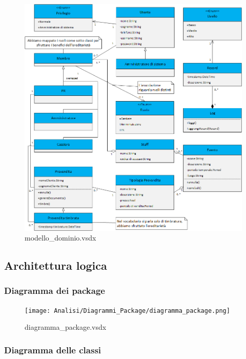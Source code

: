 \documentclass[a4paper]{article}
\begin{document}
\begin{figure}[H]
    \includegraphics[scale=0.68]{Analisi/modello_dominio.png}
    \centering
    \caption{modello\_dominio.vsdx}
\end{figure}

\newpage

\subsection{Architettura logica}

\subsubsection{Diagramma dei package}


\begin{figure}[H]
    \texttt{[image: Analisi/Diagrammi\_Package/diagramma\_package.png]}
    \centering
    \caption{diagramma\_package.vsdx}
\end{figure}

\newpage

\subsubsection{Diagramma delle classi}
\end{document}
